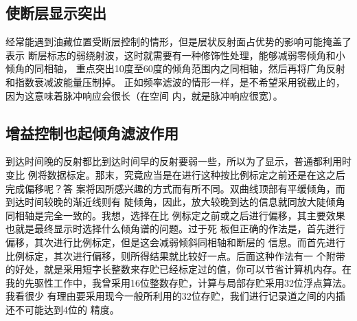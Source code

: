 \subsection{使断层显示突出}
\label{sec:4.1.10}

经常能遇到油藏位置受断层控制的情形，但是层状反射面占优势的影响可能掩盖了表示
断层标志的弱绕射波，这时就需要有一种修饰性处理，能够减弱零倾角和小倾角的同相轴，
重点突出10度至60度的倾角范围内之同相轴，然后再将广角反射和指数衰减波能量压制掉。
正如频率滤波的情形一样，是不希望采用锐截止的，因为这意味着脉冲响应会很长（在空间
内，就是脉冲响应很宽）。

\subsection{增益控制也起倾角滤波作用}
\label{sec:4.1.11}

到达时间晚的反射都比到达时间早的反射要弱一些，所以为了显示，普通都利用时变比
例将数据标定。那末，究竟应当是在进行这种按比例标定之前还是在这之后完成偏移呢？答
案将因所感兴趣的方式而有所不同。双曲线顶部有平缓倾角，而到达时间较晚的渐近线则有
陡倾角，因此，放大较晚到达的信息就同放大陡倾角同相轴是完全一致的。我想，选择在比
例标定之前或之后进行偏移，其主要效果也就是最终显示时选择什么倾角谱的问题。过于死
板但正确的作法是，首先迸行偏移，其次进行比例标定，但是这会减弱倾斜同相轴和断层的
信息。而首先进行比例标定，其次进行偏移，则所得结果就比较好一点。后面这种作法有一
个附带的好处，就是采用短字长整数来存贮已经标定过的值，你可以节省计算机内存。在
我的先驱性工作中，我曾采用16位整数存贮，计算与局部存贮采用32位浮点算法。我看很少
有理由要采用现今一般所利用的32位存贮，我们进行记录道之间的内插还不可能达到4位的
精度。

